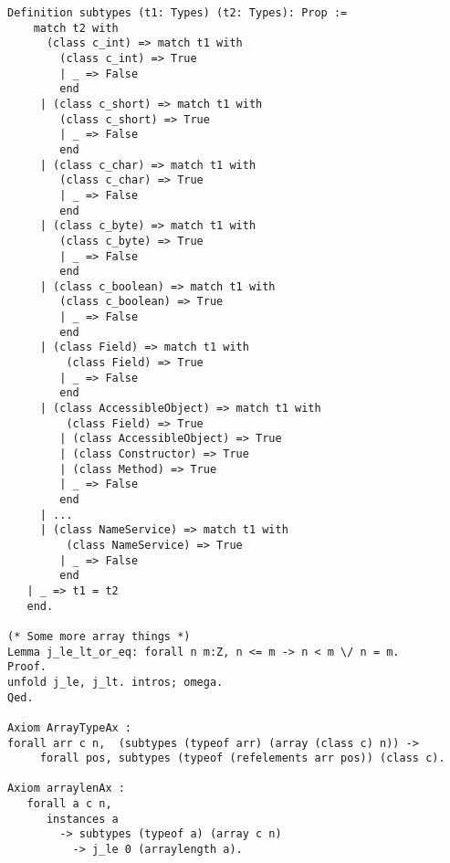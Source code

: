 \begin{verbatim}
Definition subtypes (t1: Types) (t2: Types): Prop :=
    match t2 with
      (class c_int) => match t1 with
        (class c_int) => True
        | _ => False
        end
     | (class c_short) => match t1 with
        (class c_short) => True
        | _ => False
        end
     | (class c_char) => match t1 with
        (class c_char) => True
        | _ => False
        end
     | (class c_byte) => match t1 with
        (class c_byte) => True
        | _ => False
        end
     | (class c_boolean) => match t1 with
        (class c_boolean) => True
        | _ => False
        end
     | (class Field) => match t1 with
         (class Field) => True
        | _ => False
        end
     | (class AccessibleObject) => match t1 with
         (class Field) => True
        | (class AccessibleObject) => True
        | (class Constructor) => True
        | (class Method) => True
        | _ => False
        end
     | ...
     | (class NameService) => match t1 with
         (class NameService) => True
        | _ => False
        end
   | _ => t1 = t2
   end.

(* Some more array things *)
Lemma j_le_lt_or_eq: forall n m:Z, n <= m -> n < m \/ n = m.
Proof.
unfold j_le, j_lt. intros; omega.
Qed.

Axiom ArrayTypeAx :
forall arr c n,  (subtypes (typeof arr) (array (class c) n)) -> 
     forall pos, subtypes (typeof (refelements arr pos)) (class c).

Axiom arraylenAx : 
   forall a c n, 
      instances a 
        -> subtypes (typeof a) (array c n) 
          -> j_le 0 (arraylength a).
\end{verbatim}
